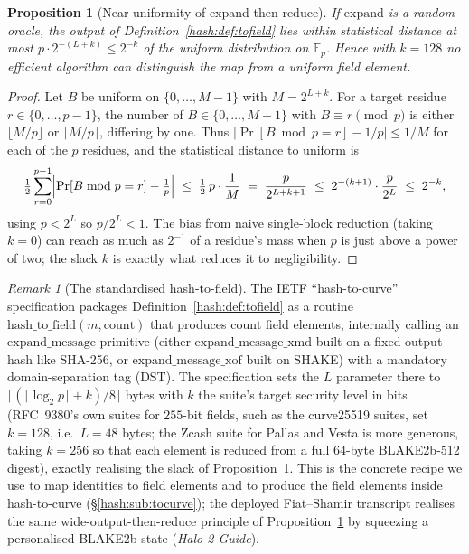 \documentclass[11pt,a4paper]{article}
\newtheorem{proposition}[theorem]{Proposition}
\theoremstyle{definition}
\theoremstyle{remark}
\newtheorem{remark}[theorem]{Remark}
\newcommand{\Fp}{\ensuremath{\mathbb{F}_{p}}}
\begin{document}
\begin{proposition}[Near-uniformity of expand-then-reduce]\label{hash:prop:tofield}
If \(\mathrm{expand}\) is a random oracle, the output of Definition~\ref{hash:def:tofield} lies within statistical distance at most \(p \cdot 2^{-(L+k)} \leq 2^{-k}\) of the uniform distribution on \(\Fp\). Hence with \(k = 128\) no efficient algorithm can distinguish the map from a uniform field element.
\end{proposition}

\begin{proof}
Let \(B\) be uniform on \(\{0,\dots,M-1\}\) with \(M = 2^{L+k}\). For a target residue \(r \in \{0,\dots,p-1\}\), the number of \(B \in \{0,\dots,M-1\}\) with \(B \equiv r \pmod p\) is either \(\lfloor M/p \rfloor\) or \(\lceil M/p \rceil\), differing by one. Thus \(\bigl|\Pr[B \bmod p = r] - 1/p\bigr| \leq 1/M\) for each of the \(p\) residues, and the statistical distance to uniform is
\[
  \tfrac{1}{2}\sum_{r=0}^{p-1}\Bigl| \Pr[B \bmod p = r] - \tfrac1p \Bigr|
  \;\leq\;
  \tfrac{1}{2}\, p \cdot \frac{1}{M}
  \;=\;
  \frac{p}{2^{L+k+1}}
  \;\leq\;
  2^{-(k+1)} \cdot \frac{p}{2^{L}}
  \;\leq\;
  2^{-k},
\]
using \(p < 2^{L}\) so \(p/2^{L} < 1\). The bias from naive single-block reduction (taking \(k = 0\)) can reach as much as \(2^{-1}\) of a residue's mass when \(p\) is just above a power of two; the slack \(k\) is exactly what reduces it to negligibility.
\end{proof}

\begin{remark}[The standardised hash-to-field]\label{hash:rem:h2f}
The IETF ``hash-to-curve'' specification packages Definition~\ref{hash:def:tofield} as a routine \(\mathrm{hash\_to\_field}(m, \mathrm{count})\) that produces \(\mathrm{count}\) field elements, internally calling an \(\mathrm{expand\_message}\) primitive (either \(\mathrm{expand\_message\_xmd}\) built on a fixed-output hash like SHA-256, or \(\mathrm{expand\_message\_xof}\) built on SHAKE) with a mandatory domain-separation tag (DST). The specification sets the \(L\) parameter there to \(\lceil(\lceil\log_{2} p\rceil + k)/8\rceil\) bytes with \(k\) the suite's target security level in bits (RFC~9380's own suites for \(255\)-bit fields, such as the curve25519 suites, set \(k = 128\), i.e.\ \(L = 48\) bytes; the Zcash suite for Pallas and Vesta is more generous, taking \(k = 256\) so that each element is reduced from a full \(64\)-byte BLAKE2b-512 digest), exactly realising the slack of Proposition~\ref{hash:prop:tofield}. This is the concrete recipe we use to map identities to field elements and to produce the field elements inside hash-to-curve (\S\ref{hash:sub:tocurve}); the deployed Fiat--Shamir transcript realises the same wide-output-then-reduce principle of Proposition~\ref{hash:prop:tofield} by squeezing a personalised BLAKE2b state (\emph{Halo 2 Guide}).
\end{remark}
\end{document}
